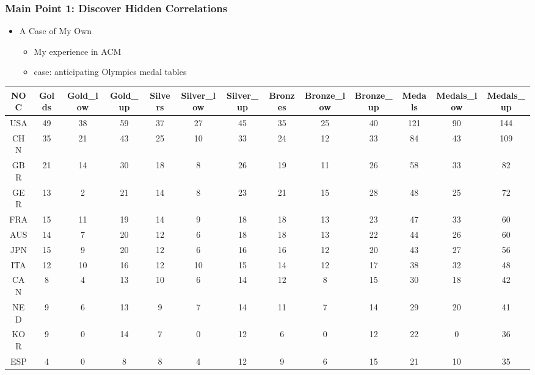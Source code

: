 \documentclass{beamer}
\begin{document}
\begin{frame}[t]
\frametitle{Main Point 1: Discover Hidden Correlations}
\begin{minipage}{\textwidth}
{\linespread{1.3}
\begin{itemize}
    \item {\Large A Case of My Own}
    \begin{itemize}
        \item {\large My experience in ACM}
        \item {\large case: anticipating Olympics medal tables}
    \end{itemize}
\end{itemize}
}

\vspace{0.7em} %

\centering
\tiny
\begin{tabular}{|c|c|c|c|c|c|c|c|c|c|c|c|c|}
\hline
\textbf{NOC} & \textbf{Golds} & \textbf{Gold\_low} & \textbf{Gold\_up} & \textbf{Silvers} & \textbf{Silver\_low} & \textbf{Silver\_up} & \textbf{Bronzes} & \textbf{Bronze\_low} & \textbf{Bronze\_up} & \textbf{Medals} & \textbf{Medals\_low} & \textbf{Medals\_up} \\
\hline
        USA & 49 & 38 & 59 & 37 & 27 & 45 & 35 & 25 & 40 & 121 & 90 & 144 \\
        CHN & 35 & 21 & 43 & 25 & 10 & 33 & 24 & 12 & 33 & 84 & 43 & 109 \\
        GBR & 21 & 14 & 30 & 18 & 8 & 26 & 19 & 11 & 26 & 58 & 33 & 82 \\
        GER & 13 & 2 & 21 & 14 & 8 & 23 & 21 & 15 & 28 & 48 & 25 & 72 \\
        FRA & 15 & 11 & 19 & 14 & 9 & 18 & 18 & 13 & 23 & 47 & 33 & 60 \\
        AUS & 14 & 7 & 20 & 12 & 6 & 18 & 18 & 13 & 22 & 44 & 26 & 60 \\
        JPN & 15 & 9 & 20 & 12 & 6 & 16 & 16 & 12 & 20 & 43 & 27 & 56 \\
        ITA & 12 & 10 & 16 & 12 & 10 & 15 & 14 & 12 & 17 & 38 & 32 & 48 \\
        CAN & 8 & 4 & 13 & 10 & 6 & 14 & 12 & 8 & 15 & 30 & 18 & 42 \\
        NED & 9 & 6 & 13 & 9 & 7 & 14 & 11 & 7 & 14 & 29 & 20 & 41 \\
        KOR & 9 & 0 & 14 & 7 & 0 & 12 & 6 & 0 & 12 & 22 & 0 & 36 \\
        ESP & 4 & 0 & 8 & 8 & 4 & 12 & 9 & 6 & 15 & 21 & 10 & 35 \\

\end{tabular}
\end{minipage}
\end{frame}
\end{document}
